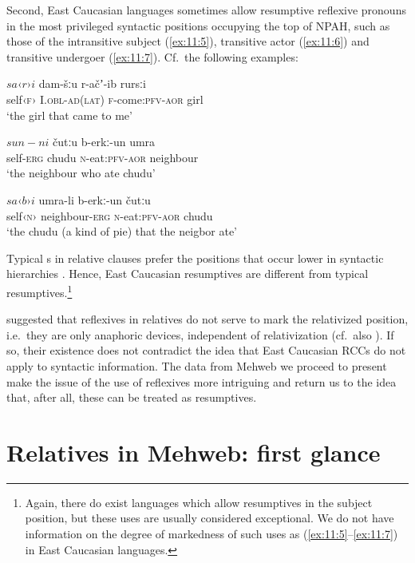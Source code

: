 ﻿\documentclass[output=paper]{langsci/langscibook}
\begin{document}
Second, East Caucasian languages sometimes allow resumptive reflexive
pronouns in the most privileged syntactic positions occupying the top of
NPAH, such as those of the intransitive subject (\ref{ex:11:5}), transitive actor
(\ref{ex:11:6}) and transitive undergoer (\ref{ex:11:7}). Cf.\ the following 
examples:

\ea \label{ex:11:5} %
\gll \(sa‹r›i\) dam-šːu r-ačʼ-ib rursːi\\
 self‹\textsc{f}› I.\textsc{obl}-\textsc{ad}(\textsc{lat})   \textsc{f}-come:\textsc{pfv}-\textsc{aor} girl\\
\glt  `the girl that came to me'

\ex \label{ex:11:6} %
\gll \(sun-ni\) čutːu b-erkː-un umra\\
self-\textsc{erg} chudu \textsc{n}-eat:\textsc{pfv}-\textsc{aor} neighbour\\
\glt `the neighbour who ate chudu'

\ex \label{ex:11:7} %
\gll  \(sa‹b›i\) umra-li b-erkː-un čutːu\\
self‹\textsc{n}› neighbour-\textsc{erg} \textsc{n}-eat:\textsc{pfv}-\textsc{aor} chudu\\
\glt `the chudu (a kind of pie) that the neigbor ate'
\z

Typical s in relative clauses prefer the positions
that occur lower in syntactic hierarchies \citep[92]{keenan-comrie1977,maxwell1979}.
Hence, East Caucasian resumptives are different from
typical resumptives.\footnote{Again, there do exist languages which
  allow resumptives in the subject position, but these uses are usually
  considered exceptional. We do not have information on the degree of
  markedness of such uses as (\ref{ex:11:5}–\ref{ex:11:7}) in East Caucasian languages.}

\citet{daniel-lander2008} suggested that reflexives in relatives do not
serve to mark the relativized position, i.e.\ they are only anaphoric
devices, independent of relativization (cf.\ also \citealt[133]{comrie-etal2017}).
If so, their existence does not contradict the idea that East
Caucasian RCCs do not apply to syntactic information. The data from
Mehweb we proceed to present make the issue of the use of reflexives
more intriguing and return us to the idea that, after all, these can be
treated as resumptives.

\section{Relatives in Mehweb: first glance}\label{relatives-in-mehweb}
\end{document}

